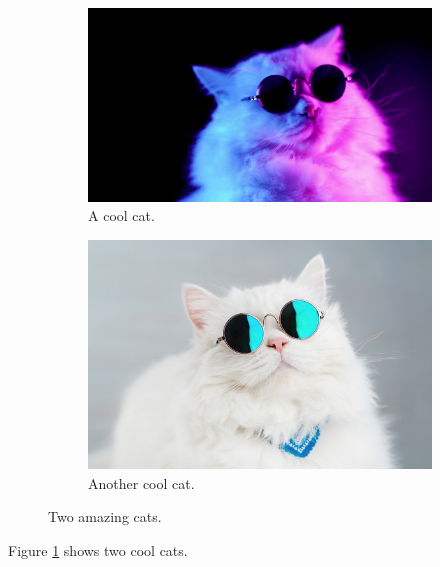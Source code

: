 \documentclass{article}
\begin{document}
\begin{figure}[h!]
\begin{subfigure}[b]{0.4\linewidth}
	\includegraphics[width=\linewidth]{cool_cat.jpg}
	\caption{A cool cat.}
\end{subfigure}
\begin{subfigure}[b]{0.4\linewidth}
	\includegraphics[width=\linewidth]{another_cool_cat.jpg}
	\caption{Another cool cat.}
\end{subfigure}
\caption{Two amazing cats.}
\label{fig:two_cats}
\end{figure}

Figure \ref{fig:two_cats} shows two cool cats.
\end{document}
